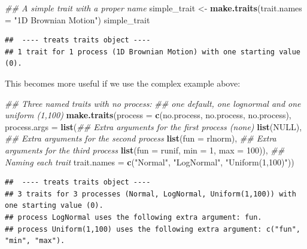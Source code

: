 \documentclass[
]{book}
\newenvironment{Shaded}{\begin{snugshade}}{\end{snugshade}}
\newcommand{\CommentTok}[1]{\textcolor[rgb]{0.56,0.35,0.01}{\textit{#1}}}
\newcommand{\DataTypeTok}[1]{\textcolor[rgb]{0.13,0.29,0.53}{#1}}
\newcommand{\DecValTok}[1]{\textcolor[rgb]{0.00,0.00,0.81}{#1}}
\newcommand{\KeywordTok}[1]{\textcolor[rgb]{0.13,0.29,0.53}{\textbf{#1}}}
\newcommand{\NormalTok}[1]{#1}
\newcommand{\OtherTok}[1]{\textcolor[rgb]{0.56,0.35,0.01}{#1}}
\newcommand{\StringTok}[1]{\textcolor[rgb]{0.31,0.60,0.02}{#1}}
\begin{document}
\begin{Shaded}
\begin{Highlighting}[]
\CommentTok{\#\# A simple trait with a proper name}
\NormalTok{simple\_trait \textless{}{-}}\StringTok{ }\KeywordTok{make.traits}\NormalTok{(}\DataTypeTok{trait.names =} \StringTok{"1D Brownian Motion"}\NormalTok{)}
\NormalTok{simple\_trait}
\end{Highlighting}
\end{Shaded}

\begin{verbatim}
##  ---- treats traits object ---- 
## 1 trait for 1 process (1D Brownian Motion) with one starting value (0).
\end{verbatim}

This becomes more useful if we use the complex example above:

\begin{Shaded}
\begin{Highlighting}[]
\CommentTok{\#\# Three named traits with no process:}
\CommentTok{\#\# one default, one lognormal and one uniform (1,100)}
\KeywordTok{make.traits}\NormalTok{(}\DataTypeTok{process      =} \KeywordTok{c}\NormalTok{(no.process, no.process, no.process),}
            \DataTypeTok{process.args =} \KeywordTok{list}\NormalTok{(}\CommentTok{\#\# Extra arguments for the first process (none)}
                                \KeywordTok{list}\NormalTok{(}\OtherTok{NULL}\NormalTok{),}
                                \CommentTok{\#\# Extra arguments for the second process}
                                \KeywordTok{list}\NormalTok{(}\DataTypeTok{fun =}\NormalTok{ rlnorm),}
                                \CommentTok{\#\# Extra arguments for the third process}
                                \KeywordTok{list}\NormalTok{(}\DataTypeTok{fun =}\NormalTok{ runif, }\DataTypeTok{min =} \DecValTok{1}\NormalTok{, }\DataTypeTok{max =} \DecValTok{100}\NormalTok{)),}
            \CommentTok{\#\# Naming each trait}
            \DataTypeTok{trait.names  =} \KeywordTok{c}\NormalTok{(}\StringTok{"Normal"}\NormalTok{, }\StringTok{"LogNormal"}\NormalTok{, }\StringTok{"Uniform(1,100)"}\NormalTok{))}
\end{Highlighting}
\end{Shaded}

\begin{verbatim}
##  ---- treats traits object ---- 
## 3 traits for 3 processes (Normal, LogNormal, Uniform(1,100)) with one starting value (0).
## process LogNormal uses the following extra argument: fun.
## process Uniform(1,100) uses the following extra argument: c("fun", "min", "max").
\end{verbatim}
\end{document}

